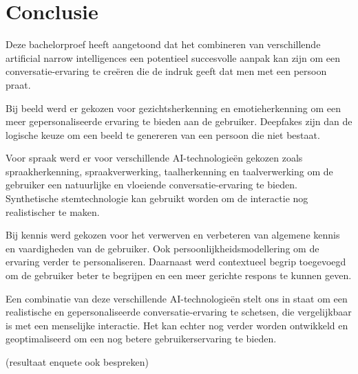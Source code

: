 
\chapter{Conclusie}
\label{ch:conclusie}


Deze bachelorproef heeft aangetoond dat het combineren van verschillende artificial narrow intelligences een potentieel succesvolle aanpak kan zijn om een conversatie-ervaring te creëren die de indruk geeft dat men met een persoon praat.

Bij beeld werd er gekozen voor gezichtsherkenning en emotieherkenning om een meer gepersonaliseerde ervaring te bieden aan de gebruiker. Deepfakes zijn dan de logische keuze om een beeld te genereren van een persoon die niet bestaat.

Voor spraak werd er voor verschillende AI-technologieën gekozen zoals spraakherkenning, spraakverwerking, taalherkenning en taalverwerking om de gebruiker een natuurlijke en vloeiende conversatie-ervaring te bieden. Synthetische stemtechnologie kan gebruikt worden om de interactie nog realistischer te maken.

Bij kennis werd gekozen voor het verwerven en verbeteren van algemene kennis en vaardigheden van de gebruiker. Ook persoonlijkheidsmodellering om de ervaring verder te personaliseren. Daarnaast werd contextueel begrip toegevoegd om de gebruiker beter te begrijpen en een meer gerichte respons te kunnen geven.

Een combinatie van deze verschillende AI-technologieën stelt ons in staat om een realistische en gepersonaliseerde conversatie-ervaring te schetsen, die vergelijkbaar is met een menselijke interactie. Het kan echter nog verder worden ontwikkeld en geoptimaliseerd om een nog betere gebruikerservaring te bieden.

(resultaat enquete ook bespreken)




